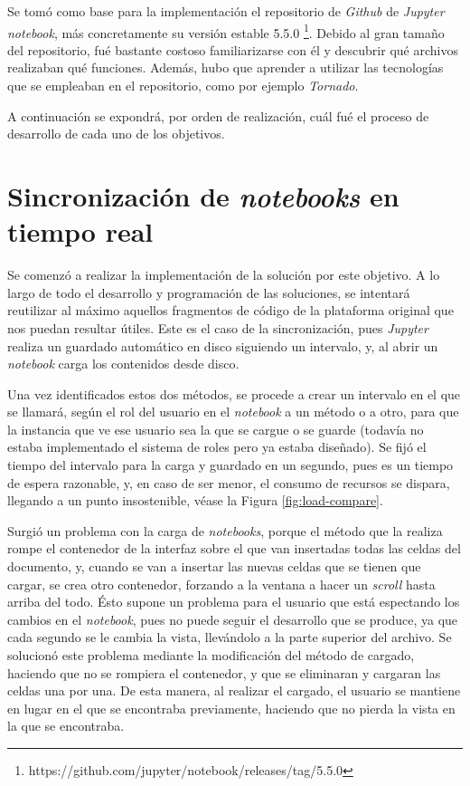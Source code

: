 \documentclass[11pt,spanish,listoffigures]{tfgetsinf}
\begin{document}
Se tomó como base para la implementación el repositorio de \textit{Github} de \textit{Jupyter notebook}, más concretamente su versión estable 5.5.0 \footnote{https://github.com/jupyter/notebook/releases/tag/5.5.0}. Debido al gran tamaño del repositorio, fué bastante costoso familiarizarse con él y descubrir qué archivos realizaban qué funciones. Además, hubo que aprender a utilizar las tecnologías que se empleaban en el repositorio, como por ejemplo \textit{Tornado}.

A continuación se expondrá, por orden de realización, cuál fué el proceso de desarrollo de cada uno de los objetivos.



\section{Sincronización de \textit{notebooks} en tiempo real}
\label{sec:desarrollo-sincro}

Se comenzó a realizar la implementación de la solución por este objetivo. A lo largo de todo el desarrollo y programación de las soluciones, se intentará reutilizar al máximo aquellos fragmentos de código de la plataforma original que nos puedan resultar útiles. Este es el caso de la sincronización, pues \textit{Jupyter} realiza un guardado automático en disco siguiendo un intervalo, y, al abrir un \textit{notebook} carga los contenidos desde disco.

Una vez identificados estos dos métodos, se procede a crear un intervalo en el que se llamará, según el rol del usuario en el \textit{notebook} a un método o a otro, para que la instancia que ve ese usuario sea la que se cargue o se guarde (todavía no estaba implementado el sistema de roles pero ya estaba diseñado). Se fijó el tiempo del intervalo para la carga y guardado en un segundo, pues es un tiempo de espera razonable, y, en caso de ser menor, el consumo de recursos se dispara, llegando a un punto insostenible, véase la Figura \ref{fig:load-compare}.

Surgió un problema con la carga de \textit{notebooks}, porque el método que la realiza rompe el contenedor de la interfaz sobre el que van insertadas todas las celdas del documento, y, cuando se van a insertar las nuevas celdas que se tienen que cargar, se crea otro contenedor, forzando a la ventana a hacer un \textit{\gls{scroll}} hasta arriba del todo. Ésto supone un problema para el usuario que está espectando los cambios en el \textit{notebook}, pues no puede seguir el desarrollo que se produce, ya que cada segundo se le cambia la vista, llevándolo a la parte superior del archivo. Se solucionó este problema mediante la modificación del método de cargado, haciendo que no se rompiera el contenedor, y que se eliminaran y cargaran las celdas una por una. De esta manera, al realizar el cargado, el usuario se mantiene en lugar en el que se encontraba previamente, haciendo que no pierda la vista en la que se encontraba.
\end{document}
